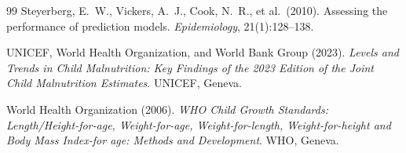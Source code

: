 \documentclass[12pt, a4paper]{article}
\begin{document}
\begin{thebibliography}{99}
Steyerberg, E.~W., Vickers, A.~J., Cook, N.~R., et al.\ (2010).
\newblock Assessing the performance of prediction models.
\newblock \textit{Epidemiology}, 21(1):128--138.

UNICEF, World Health Organization, and World Bank Group (2023).
\newblock \textit{Levels and Trends in Child Malnutrition: Key Findings of the
2023 Edition of the Joint Child Malnutrition Estimates}.
\newblock UNICEF, Geneva.

World Health Organization (2006).
\newblock \textit{WHO Child Growth Standards: Length/Height-for-age,
Weight-for-age, Weight-for-length, Weight-for-height and Body Mass Index-for
age: Methods and Development}.
\newblock WHO, Geneva.

\end{thebibliography}
\end{document}

